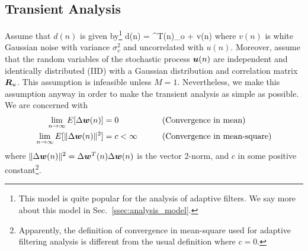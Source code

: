 \subsection{Transient Analysis}
Assume that $d(n)$ is given by\footnote{This model is quite popular for the analysis of adaptive filters. We say more about this model in Sec.~\ref{ssec:analysis_model}.}
\bmath
  d(n) = ^T(n)_o + v(n)
  \label{eq:desired_model}
\emath
where $v(n)$ is white Gaussian noise with variance $\sigma_v^2$ and uncorrelated with $u(n)$.  Moreover, assume that the random variables of the stochastic process $\boldsymbol{u}(n)$ are independent and identically distributed (IID) with a Gaussian distribution and correlation matrix $\boldsymbol{R}_u$. This assumption is infeasible unless $M=1$. Nevertheless, we make this assumption anyway in order to make the transient analysis as simple as possible. We are concerned with
\begin{alignat*}{2}
  \lim_{n\to\infty} E[\Delta\boldsymbol{w}(n)] &= 0 &\qquad &\text{(Convergence in mean)}\\
  \lim_{n\to\infty} E[\|\Delta\boldsymbol{w}(n)\|^2] &= c < \infty &\qquad &\text{(Convergence in mean-square)}
\end{alignat*}
where $\|\Delta\boldsymbol{w}(n)\|^2=\Delta\boldsymbol{w}^T(n)\Delta\boldsymbol{w}(n)$ is the vector 2-norm, and $c$ in some positive constant\footnote{Apparently, the definition of convergence in mean-square used for adaptive filtering analysis is different from the usual definition where $c=0$.}.

